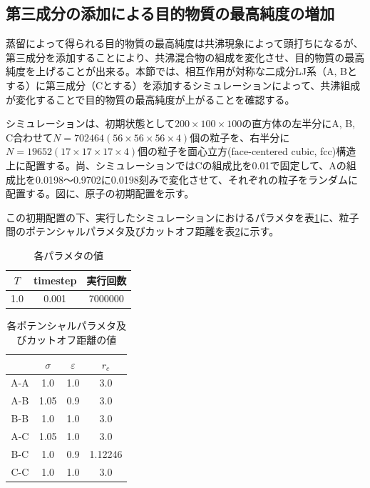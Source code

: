 \documentclass[titlepage]{jsreport}
\begin{document}
\subsection{第三成分の添加による目的物質の最高純度の増加} \label{method-subsec:bi-component-addition-of-3rd-component-highest-purity}
蒸留によって得られる目的物質の最高純度は共沸現象によって頭打ちになるが、第三成分を添加することにより、共沸混合物の組成を変化させ、目的物質の最高純度を上げることが出来る\cite{azeotrope-add_third_component}。本節では、相互作用が対称な二成分LJ系（A, Bとする）に第三成分（Cとする）を添加するシミュレーションによって、共沸組成が変化することで目的物質の最高純度が上がることを確認する。

シミュレーションは、初期状態として$200×100×100$の直方体の左半分にA, B, C合わせて$N=702464(56×56×56×4)$個の粒子を、右半分に$N=19652(17×17×17×4)$個の粒子を面心立方(face-centered cubic, fcc)構造上に配置する。尚、シミュレーションではCの組成比を0.01で固定して、Aの組成比を0.0198〜0.9702に0.0198刻みで変化させて、それぞれの粒子をランダムに配置する。図に、原子の初期配置を示す。

この初期配置の下、実行したシミュレーションにおけるパラメタを表\ref{table:bi-component-addition-of-3rd-component-parameter}に、粒子間のポテンシャルパラメタ及びカットオフ距離を表\ref{table:bi-component-addition-of-3rd-component-potential-parameter}に示す。

\begin{table}[htbp]
    \begin{center}
        \caption{各パラメタの値}
        \label{table:bi-component-addition-of-3rd-component-parameter}
        \begin{tabular}{c c c}
            $T$ & timestep & 実行回数 \\
            \hline
            1.0 & 0.001 & 7000000 \\
        \end{tabular}
    \end{center}
\end{table}

\begin{table}[htbp]
    \begin{center}
        \caption{各ポテンシャルパラメタ及びカットオフ距離の値}
        \label{table:bi-component-addition-of-3rd-component-potential-parameter}
        \begin{tabular}{c c c c}
            & $\sigma$ & $\varepsilon$ & $r_c$ \\
            \hline
            A-A & 1.0 & 1.0 & 3.0 \\
            A-B & 1.05 & 0.9 & 3.0 \\
            B-B & 1.0 & 1.0 & 3.0 \\
            A-C & 1.05 & 1.0 & 3.0 \\
            B-C & 1.0 & 0.9 & 1.12246 \\
            C-C & 1.0 & 1.0 & 3.0
        \end{tabular}
    \end{center}
\end{table}
\end{document}
